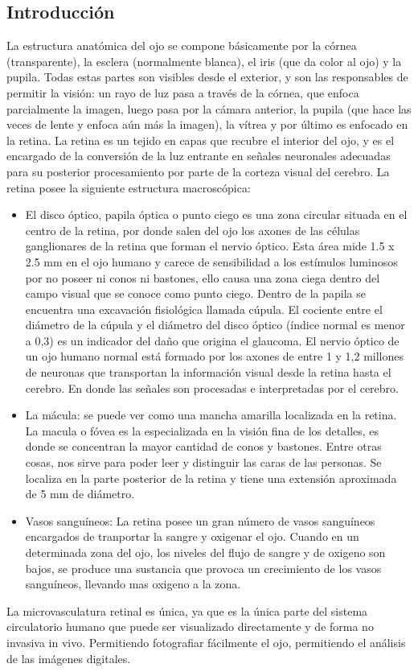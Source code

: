\subsection{Introducci\'on}

La estructura anatómica del ojo se compone básicamente por la córnea (transparente), la esclera (normalmente blanca), el iris (que da color al ojo) y la pupila. Todas estas partes son visibles desde el exterior, y son las responsables de permitir la visión: un rayo de luz pasa a través de la córnea, que enfoca parcialmente la imagen, luego pasa por la cámara anterior, la pupila (que hace las veces de lente y enfoca aún más la imagen), la vítrea y por último es enfocado en la retina. La retina es un tejido en capas que recubre el interior del ojo, y es el encargado de la conversi\'on de la luz entrante en señales neuronales adecuadas para su posterior procesamiento por parte de la corteza visual del cerebro.
La retina posee la siguiente estructura macrosc\'opica:
\begin{itemize}
\item El disco \'optico, papila \'optica o punto ciego es una zona circular situada en el centro de la retina, por donde salen del ojo los axones de las c\'elulas ganglionares de la retina que forman el nervio \'optico. Esta \'area mide 1.5 x 2.5 mm en el ojo humano y carece de sensibilidad a los est\'imulos luminosos por no poseer ni conos ni bastones, ello causa una zona ciega dentro del campo visual que se conoce como punto ciego. Dentro de la papila se encuentra una excavaci\'on fisiol\'ogica llamada c\'upula. El cociente entre el di\'ametro de la c\'upula y el di\'ametro del disco \'optico (\'indice normal es menor a 0,3) es un indicador del daño que origina el glaucoma. El nervio \'optico de un ojo humano normal est\'a formado por los axones de entre 1 y 1,2 millones de neuronas que transportan la informaci\'on visual desde la retina hasta el cerebro. En donde las señales son procesadas e interpretadas por el cerebro.
\item La m\'acula: se puede ver como una mancha amarilla localizada en la retina. La macula o f\'ovea es la especializada en la visi\'on fina de los detalles, es donde se concentran la mayor cantidad de conos y bastones. Entre otras cosas, nos sirve para poder leer y distinguir las caras de las personas. Se localiza en la parte posterior de la retina y tiene una extensi\'on aproximada de 5 mm de di\'ametro.
\item Vasos sangu\'ineos: La retina posee un gran n\'umero de vasos sangu\'ineos encargados de tranportar la sangre y oxigenar el ojo. Cuando en un determinada zona del ojo, los niveles del flujo de sangre y de oxigeno son bajos, se produce una sustancia que provoca un crecimiento de los vasos sangu\'ineos, llevando mas oxigeno a la zona.
\end{itemize}
La microvasculatura retinal es \'unica, ya que es la \'unica parte del sistema circulatorio humano que puede ser visualizado directamente y de forma no invasiva in vivo. Permitiendo fotografiar f\'acilmente el ojo, permitiendo el an\'alisis de las im\'agenes digitales.  \cite{patton2006retinal}

